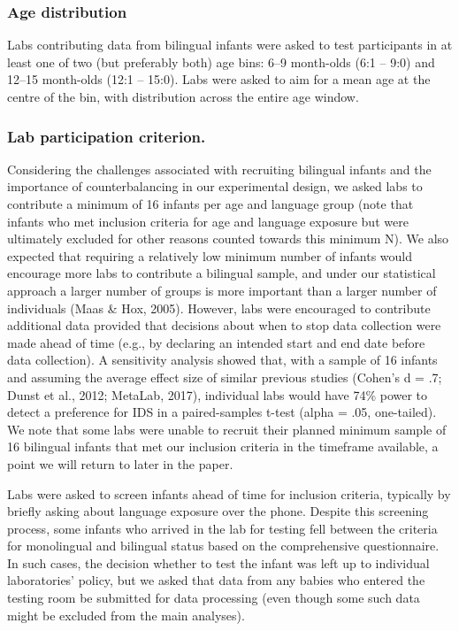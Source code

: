 \documentclass[english,,man,floatsintext]{apa6}
\begin{document}
\hypertarget{age-distribution}{%
\subsubsection{Age distribution}\label{age-distribution}}

Labs contributing data from bilingual infants were asked to test participants in at least one of two (but preferably both) age bins: 6--9 month-olds (6:1 -- 9:0) and 12--15 month-olds (12:1 -- 15:0). Labs were asked to aim for a mean age at the centre of the bin, with distribution across the entire age window.

\hypertarget{lab-participation-criterion.}{%
\subsubsection{Lab participation criterion.}\label{lab-participation-criterion.}}

Considering the challenges associated with recruiting bilingual infants and the importance of counterbalancing in our experimental design, we asked labs to contribute a minimum of 16 infants per age and language group (note that infants who met inclusion criteria for age and language exposure but were ultimately excluded for other reasons counted towards this minimum N). We also expected that requiring a relatively low minimum number of infants would encourage more labs to contribute a bilingual sample, and under our statistical approach a larger number of groups is more important than a larger number of individuals (Maas \& Hox, 2005). However, labs were encouraged to contribute additional data provided that decisions about when to stop data collection were made ahead of time (e.g., by declaring an intended start and end date before data collection). A sensitivity analysis showed that, with a sample of 16 infants and assuming the average effect size of similar previous studies (Cohen's d = .7; Dunst et al., 2012; MetaLab, 2017), individual labs would have 74\% power to detect a preference for IDS in a paired-samples t-test (alpha = .05, one-tailed). We note that some labs were unable to recruit their planned minimum sample of 16 bilingual infants that met our inclusion criteria in the timeframe available, a point we will return to later in the paper.

Labs were asked to screen infants ahead of time for inclusion criteria, typically by briefly asking about language exposure over the phone. Despite this screening process, some infants who arrived in the lab for testing fell between the criteria for monolingual and bilingual status based on the comprehensive questionnaire. In such cases, the decision whether to test the infant was left up to individual laboratories' policy, but we asked that data from any babies who entered the testing room be submitted for data processing (even though some such data might be excluded from the main analyses).
\end{document}
